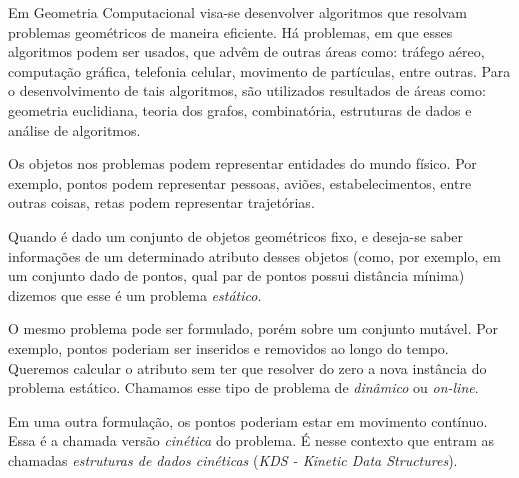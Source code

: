 

\label{cap:introducao}

\enlargethispage{.5\baselineskip}

Em Geometria Computacional visa-se desenvolver algoritmos que
resolvam problemas geométricos de maneira eficiente. Há problemas,
em que esses algoritmos podem ser usados, que advêm de outras áreas
como: tráfego aéreo, computação gráfica, telefonia celular,
movimento de partículas, entre outras. Para o desenvolvimento de
tais algoritmos, são utilizados resultados de áreas como: geometria
euclidiana, teoria dos grafos, combinatória, estruturas de dados e
análise de algoritmos.

Os objetos nos problemas podem representar entidades do mundo
físico. Por exemplo, pontos podem representar pessoas, aviões,
estabelecimentos, entre outras coisas, retas podem representar
trajetórias.

Quando é dado um conjunto de objetos geométricos fixo, e deseja-se
saber informações de um determinado atributo desses objetos (como,
por exemplo, em um conjunto dado de pontos, qual par de pontos
possui distância mínima) dizemos que esse é um problema
\textit{estático}.

O mesmo problema pode ser formulado, porém sobre um conjunto
mutável. Por exemplo, pontos poderiam ser inseridos e removidos ao
longo do tempo. Queremos calcular o atributo sem ter que resolver do
zero a nova instância do problema estático. Chamamos esse tipo de
problema de \textit{dinâmico} ou \textit{on-line}.

Em uma outra formulação, os pontos poderiam estar em movimento
contínuo. Essa é a chamada versão \textit{cinética} do problema. É
nesse contexto que entram as chamadas \textit{estruturas de dados
cinéticas} (\emph{KDS - Kinetic Data Structures}).

